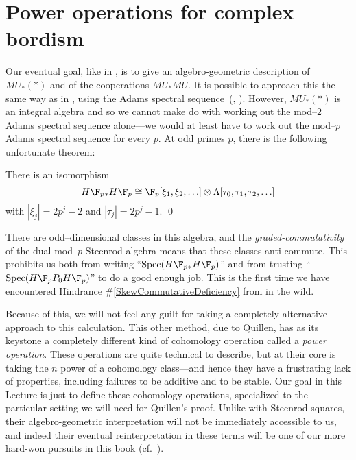 \section{Power operations for complex bordism}


Our eventual goal, like in , is to give an algebro-geometric description of $MU_*(*)$ and of the cooperations $MU_* MU$.  It is possible to approach this the same way as in , using the Adams spectral sequence~(\cite[Theorem 2]{QuillenAdamsSS}, \cite[Lecture 9]{LurieChromaticCourseNotes}).  However, $MU_*(*)$ is an integral algebra and so we cannot make do with working out the mod--$2$ Adams spectral sequence alone---we would at least have to work out the mod--$p$ Adams spectral sequence for every $p$.  At odd primes $p$, there is the following unfortunate theorem:
\begin{theorem}
There is an isomorphism
\[H\F_p{}_* H\F_p \cong \F_p[\xi_1, \xi_2, \ldots] \otimes \Lambda[\tau_0, \tau_1, \tau_2, \ldots]\]
with $|\xi_j| = 2p^j-2$ and $|\tau_j| = 2p^j - 1$. \qed
\end{theorem}
\noindent There are odd--dimensional classes in this algebra, and the \emph{graded-commutativity} of the dual mod--$p$ Steenrod algebra means that these classes anti-commute.  This prohibits us both from writing ``$\Spec(H\F_p{}_* H\F_p)$'' and from trusting ``$\Spec(H\F_pP_0 H\F_p)$'' to do a good enough job.  This is the first time we have encountered Hindrance \#\ref{SkewCommutativeDeficiency} from  in the wild.

Because of this, we will not feel any guilt for taking a completely alternative approach to this calculation.  This other method, due to Quillen, has as its keystone a completely different kind of cohomology operation called a \textit{power operation}.  These operations are quite technical to describe, but at their core is taking the $n${\th} power of a cohomology class---and hence they have a frustrating lack of properties, including failures to be additive and to be stable.  Our goal in this Lecture is just to define these cohomology operations, specialized to the particular setting we will need for Quillen's proof.  Unlike with Steenrod squares, their algebro-geometric interpretation will not be immediately accessible to us, and indeed their eventual reinterpretation in these terms will be one of our more hard-won pursuits in this book (cf.\ ).

